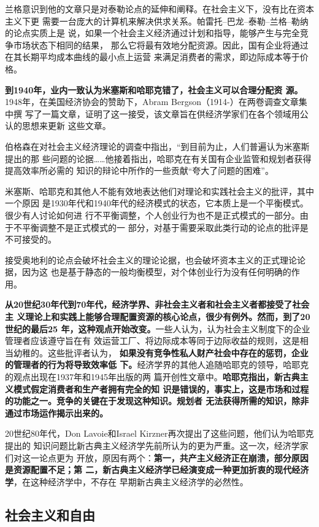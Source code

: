兰格意识到他的文章只是对泰勒论点的延伸和阐释。在社会主义下，没有比在资本主义下更
需要一台庞大的计算机来解决供求关系。帕雷托--巴龙--泰勒--兰格--勒纳的论点实质上是
说，如果一个社会主义经济通过计划和指导，能够产生与完全竞争市场状态下相同的结果，
那么它将最有效地分配资源。因此，国有企业将通过在其长期平均成本曲线的最小点上运营
来满足消费者的需求，即边际成本等于价格。

\textbf{到1940年，业内一致认为米塞斯和哈耶克错了，社会主义可以合理分配资
源。}1948年，在美国经济协会的赞助下，Abram Bergson（1914-）在两卷调查文章集中撰
写了一篇文章，证明了这一接受，该文章旨在供经济学家们在各个领域用公认的思想来更新
这些文章。

伯格森在对社会主义经济理论的调查中指出，“到目前为止，人们普遍认为米塞斯提出的那
些问题的论据……他接着指出，哈耶克在有关国有企业监管和规划者获得提高效率所必需的
知识的辩论中所作的一些贡献“夸大了问题的困难”。

米塞斯、哈耶克和其他人不能有效地表达他们对理论和实践社会主义的批评，其中一个原因
是1930年代和1940年代的经济模式的状态，它本质上是一个平衡模式。很少有人讨论如何进
行不平衡调整，个人创业行为也不是正式模式的一部分。由于不平衡调整不是正式模式的一
部分，对基于需要采取此类行动的论点的批评是不可接受的。

接受奥地利的论点会破坏社会主义的理论论据，也会破坏资本主义的正式理论论据，因为这
也是基于静态的一般均衡模型，对个体创业行为没有任何明确的作用。

\textbf{从20世纪30年代到70年代，经济学界、非社会主义者和社会主义者都接受了社会主
义理论上和实践上能够合理配置资源的核心论点，很少有例外。然而，到了20世纪的最后25
年，这种观点开始改变。}一些人认为，认为社会主义制度下的企业管理者应该遵守旨在有
效运营工厂、将边际成本等同于边际收益的规则，这是相当幼稚的。这些批评者认为，
\textbf{如果没有竞争性私人财产社会中存在的惩罚，企业的管理者的行为将导致效率低
下。}经济学界的其他人追随哈耶克的领导，哈耶克的观点出现在1937年和1945年出版的两
篇开创性文章中。\textbf{哈耶克指出，新古典主义模式假定消费者和生产者拥有完全的知
识是错误的，事实上，这是市场和过程的功能之一。竞争的关键在于发现这种知识。规划者
无法获得所需的知识，除非通过市场运作揭示出来的。}

20世纪80年代，Don Lavoie和Israel Kirzner再次提出了这些问题，他们认为哈耶克提出的
知识问题比新古典主义经济学先前所认为的更为严重。这一次，经济学家们对这一论点更为
开放，原因有两个：\textbf{第一，共产主义经济正在崩溃，部分原因是资源配置不足；第
二，新古典主义经济学已经演变成一种更加折衷的现代经济学}，在这种经济学中，不存在
早期新古典主义经济学的必然性。

\subsection{社会主义和自由}

